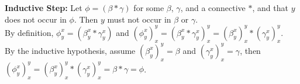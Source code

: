 \begin{problem}[9]
\begin{enumalph}
\begin{Answer}
        \step
        \textbf{Inductive Step:} Let $\phi = (\beta \ast \gamma)$ for some $\beta$, $\gamma$,
        and a connective $\ast$, and that $y$ does not occur in $\phi$.
        Then $y$ must not occur in $\beta$ or $\gamma$.\\
        By definition, $\phi^x_y = (\beta^x_y \ast \gamma^x_y)$
        and $(\phi^x_y)^y_x = (\beta^x_y \ast \gamma^x_y)^y_x
        = (\beta^x_y)^y_x \ast (\gamma^x_y)^y_x$.\\
        By the inductive hypothesis, assume $(\beta^x_y)^y_x = \beta$ and $(\gamma^x_y)^y_x = \gamma$,
        then $(\phi^x_y)^y_x = (\beta^x_y)^y_x \ast (\gamma^x_y)^y_x = \beta \ast \gamma = \phi$.
      \end{Answer}
      
  \end{enumalph}
\end{problem}
